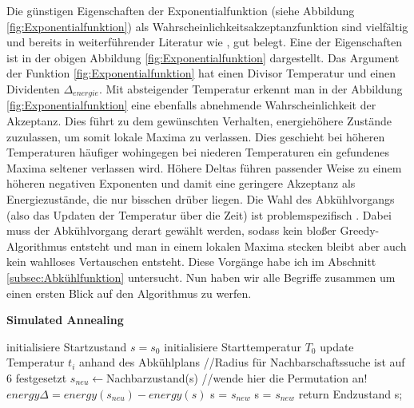 Die günstigen Eigenschaften der Exponentialfunktion (siehe Abbildung \ref{fig:Exponentialfunktion}) als
Wahrscheinlichkeitsakzeptanzfunktion sind vielfältig und bereits in weiterführender Literatur wie 
\cite{Kirkpatrick671},\cite{van1987simulated} gut belegt. Eine der Eigenschaften ist in der obigen Abbildung 
\ref{fig:Exponentialfunktion} dargestellt. Das Argument der Funktion \ref{fig:Exponentialfunktion} hat 
einen Divisor Temperatur und einen Dividenten $\Delta_{energie}$.
Mit absteigender Temperatur erkennt man 
in der Abbildung \ref{fig:Exponentialfunktion} eine ebenfalls abnehmende Wahrscheinlichkeit
der Akzeptanz. Dies führt zu dem gewünschten Verhalten, energiehöhere Zustände 
zuzulassen, um somit lokale Maxima zu verlassen. Dies geschieht bei höheren 
Temperaturen häufiger wohingegen bei niederen Temperaturen ein gefundenes Maxima
seltener verlassen wird. Höhere Deltas führen passender Weise zu einem höheren negativen 
Exponenten und damit eine geringere Akzeptanz als Energiezustände, die nur bisschen 
drüber liegen. Die Wahl des Abkühlvorgangs (also das Updaten der Temperatur über die Zeit)
ist problemspezifisch \cite[S. 9]{Kirkpatrick671}. Dabei muss der Abkühlvorgang derart
gewählt werden, sodass kein bloßer Greedy-Algorithmus entsteht und man in einem lokalen 
Maxima stecken bleibt aber auch kein wahlloses Vertauschen entsteht. Diese Vorgänge habe 
ich im Abschnitt \ref{subsec:Abkühlfunktion} untersucht.
Nun haben wir alle Begriffe zusammen um einen ersten Blick auf den Algorithmus zu werfen.

\begin{algorithm}[H]
    \caption{\textbf{Simulated Annealing}}
    \begin{algorithmic}[1]
        \State initialisiere Startzustand $s=s_{0}$
        \State initialisiere Starttemperatur $T_0$
        \State update Temperatur $t_i$ anhand des Abkühlplans
        \State //Radius für Nachbarschaftssuche ist auf 6 festgesetzt
        \State $s_{neu}\leftarrow$Nachbarzustand(s) //wende hier die Permutation an!
        \State $energy\Delta = energy(s_{neu}) - energy(s)$
        \State s = $s_{new}$
        \Else{}
        \State s = $s_{new}$
        \EndIf
        \EndIf
        \EndFor
        \State return Endzustand s;
    \end{algorithmic}
    \label{alg:retargeting}
\end{algorithm}

